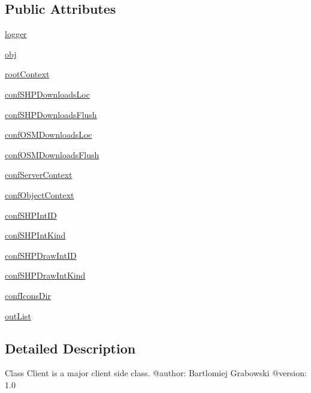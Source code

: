 \subsection*{Public Attributes}
\begin{DoxyCompactItemize}
\item 
\hyperlink{classsrc_1_1client_1_1Client_1_1Client_a963935541e9844c263bb33ac08639edb}{logger}
\item 
\hyperlink{classsrc_1_1client_1_1Client_1_1Client_a0f0a7482f5da3dad9608fc6f2627a9b5}{obj}
\item 
\hyperlink{classsrc_1_1client_1_1Client_1_1Client_a29aa6a88fd5d71d515ec6b8b36a909a5}{rootContext}
\item 
\hyperlink{classsrc_1_1client_1_1Client_1_1Client_aa20b14111bb124a2b354863c788cd280}{confSHPDownloadsLoc}
\item 
\hyperlink{classsrc_1_1client_1_1Client_1_1Client_ae712683cad57e9bbec1b4bdb3f811efd}{confSHPDownloadsFlush}
\item 
\hyperlink{classsrc_1_1client_1_1Client_1_1Client_aeea3aed67628a99df323255a65855162}{confOSMDownloadsLoc}
\item 
\hyperlink{classsrc_1_1client_1_1Client_1_1Client_a2d0dd4c721013ddac967753f6e83f554}{confOSMDownloadsFlush}
\item 
\hyperlink{classsrc_1_1client_1_1Client_1_1Client_a12748c6d9001fa2d69f58f7b053367be}{confServerContext}
\item 
\hyperlink{classsrc_1_1client_1_1Client_1_1Client_a3220a33593eb2c58f5b06ad7fd25c2bf}{confObjectContext}
\item 
\hyperlink{classsrc_1_1client_1_1Client_1_1Client_a76ee65177a12019477d5d2e9bd63ec59}{confSHPIntID}
\item 
\hyperlink{classsrc_1_1client_1_1Client_1_1Client_ad3a99ea194d0a275b304d028796e8a62}{confSHPIntKind}
\item 
\hyperlink{classsrc_1_1client_1_1Client_1_1Client_afaffc4cda18336ce7857755e3860bc97}{confSHPDrawIntID}
\item 
\hyperlink{classsrc_1_1client_1_1Client_1_1Client_a0e1b77ef395f3150d422c959a21c610c}{confSHPDrawIntKind}
\item 
\hyperlink{classsrc_1_1client_1_1Client_1_1Client_a8e8ff7747d447a77662c9893887c3927}{confIconsDir}
\item 
\hyperlink{classsrc_1_1client_1_1Client_1_1Client_a0d51a95d2a48b4812b6bc43429c36acc}{outList}
\end{DoxyCompactItemize}


\subsection{Detailed Description}
\begin{DoxyVerb}
Class Client is a major client side class.
@author: Bartlomiej Grabowski
@version: 1.0
\end{DoxyVerb}
 

